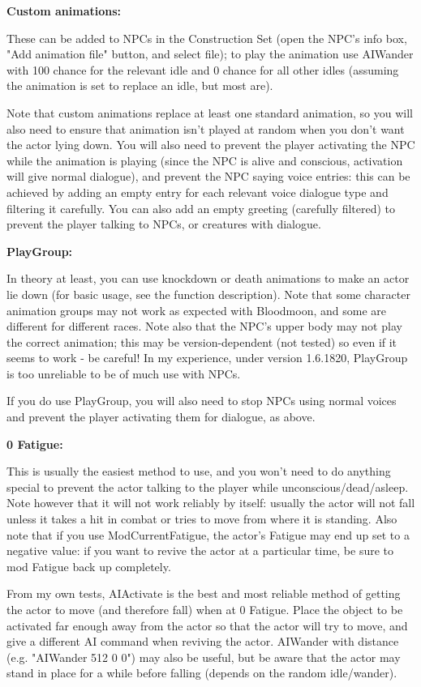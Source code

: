 \documentclass[
]{article}
\begin{document}
\textbf{Custom animations:}

These can be added to NPCs in the Construction Set (open the NPC's info
box, "Add animation file" button, and select file); to play the
animation use AIWander with 100 chance for the relevant idle and 0
chance for all other idles (assuming the animation is set to replace an
idle, but most are).

Note that custom animations replace at least one standard animation, so
you will also need to ensure that animation isn't played at random when
you don't want the actor lying down. You will also need to prevent the
player activating the NPC while the animation is playing (since the NPC
is alive and conscious, activation will give normal dialogue), and
prevent the NPC saying voice entries: this can be achieved by adding an
empty entry for each relevant voice dialogue type and filtering it
carefully. You can also add an empty greeting (carefully filtered) to
prevent the player talking to NPCs, or creatures with dialogue.

\textbf{PlayGroup:}

In theory at least, you can use knockdown or death animations to make an
actor lie down (for basic usage, see the function description). Note
that some character animation groups may not work as expected with
Bloodmoon, and some are different for different races. Note also that
the NPC's upper body may not play the correct animation; this may be
version-dependent (not tested) so even if it seems to work - be careful!
In my experience, under version 1.6.1820, PlayGroup is too unreliable to
be of much use with NPCs.

If you do use PlayGroup, you will also need to stop NPCs using normal
voices and prevent the player activating them for dialogue, as above.

\textbf{0 Fatigue:}

This is usually the easiest method to use, and you won't need to do
anything special to prevent the actor talking to the player while
unconscious/dead/asleep. Note however that it will not work reliably by
itself: usually the actor will not fall unless it takes a hit in combat
or tries to move from where it is standing. Also note that if you use
ModCurrentFatigue, the actor's Fatigue may end up set to a negative
value: if you want to revive the actor at a particular time, be sure to
mod Fatigue back up completely.

From my own tests, AIActivate is the best and most reliable method of
getting the actor to move (and therefore fall) when at 0 Fatigue. Place
the object to be activated far enough away from the actor so that the
actor will try to move, and give a different AI command when reviving
the actor. AIWander with distance (e.g. "AIWander 512 0 0") may also be
useful, but be aware that the actor may stand in place for a while
before falling (depends on the random idle/wander).
\end{document}
